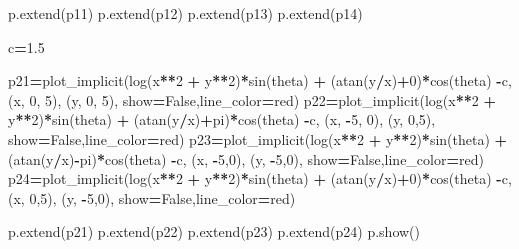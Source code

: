 \documentclass[
]{book}
\newenvironment{Shaded}{\begin{snugshade}}{\end{snugshade}}
\newcommand{\DecValTok}[1]{\textcolor[rgb]{0.00,0.00,0.81}{#1}}
\newcommand{\FloatTok}[1]{\textcolor[rgb]{0.00,0.00,0.81}{#1}}
\newcommand{\NormalTok}[1]{#1}
\newcommand{\OperatorTok}[1]{\textcolor[rgb]{0.81,0.36,0.00}{\textbf{#1}}}
\newcommand{\StringTok}[1]{\textcolor[rgb]{0.31,0.60,0.02}{#1}}
\newcommand{\VariableTok}[1]{\textcolor[rgb]{0.00,0.00,0.00}{#1}}
\theoremstyle{definition}
\theoremstyle{definition}
\theoremstyle{definition}
\theoremstyle{definition}
\theoremstyle{remark}
\begin{document}
\begin{Shaded}
\begin{Highlighting}[]
\NormalTok{p.extend(p11)}
\NormalTok{p.extend(p12)}
\NormalTok{p.extend(p13)}
\NormalTok{p.extend(p14)}

\NormalTok{c}\OperatorTok{=}\FloatTok{1.5}

\NormalTok{p21}\OperatorTok{=}\NormalTok{plot\_implicit(log(x}\OperatorTok{**}\DecValTok{2} \OperatorTok{+}\NormalTok{ y}\OperatorTok{**}\DecValTok{2}\NormalTok{)}\OperatorTok{*}\NormalTok{sin(theta) }\OperatorTok{+}\NormalTok{ (atan(y}\OperatorTok{/}\NormalTok{x)}\OperatorTok{+}\DecValTok{0}\NormalTok{)}\OperatorTok{*}\NormalTok{cos(theta) }\OperatorTok{{-}}\NormalTok{c,}
\NormalTok{(x, }\DecValTok{0}\NormalTok{, }\DecValTok{5}\NormalTok{), (y, }\DecValTok{0}\NormalTok{, }\DecValTok{5}\NormalTok{), show}\OperatorTok{=}\VariableTok{False}\NormalTok{,line\_color}\OperatorTok{=}\StringTok{\textquotesingle{}red\textquotesingle{}}\NormalTok{)}
\NormalTok{p22}\OperatorTok{=}\NormalTok{plot\_implicit(log(x}\OperatorTok{**}\DecValTok{2} \OperatorTok{+}\NormalTok{ y}\OperatorTok{**}\DecValTok{2}\NormalTok{)}\OperatorTok{*}\NormalTok{sin(theta) }\OperatorTok{+}\NormalTok{ (atan(y}\OperatorTok{/}\NormalTok{x)}\OperatorTok{+}\NormalTok{pi)}\OperatorTok{*}\NormalTok{cos(theta) }\OperatorTok{{-}}\NormalTok{c,}
\NormalTok{(x, }\OperatorTok{{-}}\DecValTok{5}\NormalTok{, }\DecValTok{0}\NormalTok{), (y, }\DecValTok{0}\NormalTok{,}\DecValTok{5}\NormalTok{), show}\OperatorTok{=}\VariableTok{False}\NormalTok{,line\_color}\OperatorTok{=}\StringTok{\textquotesingle{}red\textquotesingle{}}\NormalTok{)}
\NormalTok{p23}\OperatorTok{=}\NormalTok{plot\_implicit(log(x}\OperatorTok{**}\DecValTok{2} \OperatorTok{+}\NormalTok{ y}\OperatorTok{**}\DecValTok{2}\NormalTok{)}\OperatorTok{*}\NormalTok{sin(theta) }\OperatorTok{+}\NormalTok{ (atan(y}\OperatorTok{/}\NormalTok{x)}\OperatorTok{{-}}\NormalTok{pi)}\OperatorTok{*}\NormalTok{cos(theta) }\OperatorTok{{-}}\NormalTok{c,}
\NormalTok{(x,  }\OperatorTok{{-}}\DecValTok{5}\NormalTok{,}\DecValTok{0}\NormalTok{), (y, }\OperatorTok{{-}}\DecValTok{5}\NormalTok{,}\DecValTok{0}\NormalTok{), show}\OperatorTok{=}\VariableTok{False}\NormalTok{,line\_color}\OperatorTok{=}\StringTok{\textquotesingle{}red\textquotesingle{}}\NormalTok{)}
\NormalTok{p24}\OperatorTok{=}\NormalTok{plot\_implicit(log(x}\OperatorTok{**}\DecValTok{2} \OperatorTok{+}\NormalTok{ y}\OperatorTok{**}\DecValTok{2}\NormalTok{)}\OperatorTok{*}\NormalTok{sin(theta) }\OperatorTok{+}\NormalTok{ (atan(y}\OperatorTok{/}\NormalTok{x)}\OperatorTok{+}\DecValTok{0}\NormalTok{)}\OperatorTok{*}\NormalTok{cos(theta) }\OperatorTok{{-}}\NormalTok{c,}
\NormalTok{(x, }\DecValTok{0}\NormalTok{,}\DecValTok{5}\NormalTok{), (y, }\OperatorTok{{-}}\DecValTok{5}\NormalTok{,}\DecValTok{0}\NormalTok{), show}\OperatorTok{=}\VariableTok{False}\NormalTok{,line\_color}\OperatorTok{=}\StringTok{\textquotesingle{}red\textquotesingle{}}\NormalTok{)}


\NormalTok{p.extend(p21)}
\NormalTok{p.extend(p22)}
\NormalTok{p.extend(p23)}
\NormalTok{p.extend(p24)}
\NormalTok{p.show()}
\end{Highlighting}
\end{Shaded}
\end{document}
